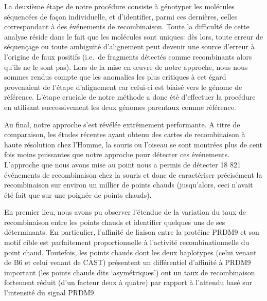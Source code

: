 {La deuxième étape de notre procédure consiste à génotyper les molécules séquencées de façon individuelle, et d'identifier, parmi ces dernières, celles correspondant à des événements de recombinaison.
Toute la difficulté de cette analyse réside dans le fait que les molécules sont uniques: dès lors, toute erreur de séquençage ou toute ambiguïté d'alignement peut devenir une source d'erreur à l'origine de faux positifs (i.e.\ de fragments détectés comme recombinants alors qu'ils ne le sont pas).
Lors de la mise en œuvre de notre approche, nous nous sommes rendus compte que les anomalies les plus critiques à cet égard provenaient de l'étape d'alignement car celui-ci est biaisé vers le génome de référence.
L'étape cruciale de notre méthode a donc été d'effectuer la procédure en utilisant successivement les deux génomes parentaux comme référence.

Au final, notre approche s'est révélée extrêmement performante.
A titre de comparaison, les études récentes ayant obtenu des cartes de recombinaison à haute résolution chez l'Homme, la souris ou l'oiseau \citep{halldorsson2016rate,smeds2016highresolution,li2018highresolution} se sont montrées plus de cent fois moins puissantes que notre approche pour détecter ces événements.\\


L'approche que nous avons mise au point nous a permis de détecter 18 821 événements de recombinaison chez la souris et donc de caractériser précisément la recombinaison sur environ un millier de points chauds (jusqu'alors, ceci n'avait été fait que sur une poignée de points chauds).

En premier lieu, nous avons pu observer l'étendue de la variation du taux de recombinaison entre les points chauds et identifier quelques uns de ses déterminants.
En particulier, l'affinité de liaison entre la protéine PRDM9 et son motif cible est parfaitement proportionnelle à l'activité recombinationnelle du point chaud.
Toutefois, les points chauds dont les deux haplotypes (celui venant de B6 et celui venant de CAST) présentent un différentiel d'affinité à PRDM9 important (les points chauds dits ‘asymétriques’) ont un taux de recombinaison fortement réduit (d'un facteur deux à quatre) par rapport à l'attendu basé sur l'intensité du signal PRDM9.

}
